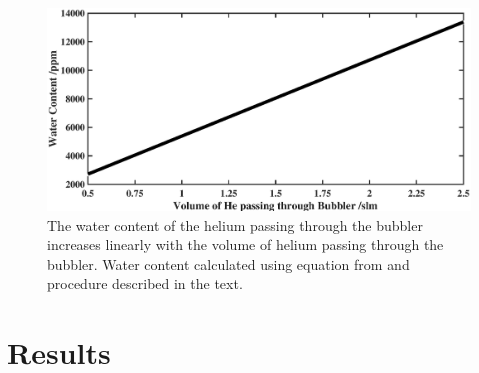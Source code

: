 \documentclass[11pt, oneside]{article}   	%
\begin{document}
\begin{figure}
    \centering
    \includegraphics[width=\textwidth]{Figures/WaterContentBig.eps}
    \caption{The water content of the helium passing through the bubbler increases linearly with the volume of helium passing through the bubbler. Water content calculated using equation from \cite{Alduchov1996} and procedure described in the text.}
    \label{fig:WaterContent}
\end{figure}





\section{Results}
\end{document}
